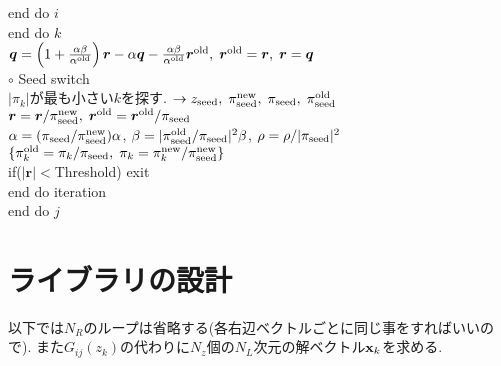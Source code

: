 \documentclass[12pt,titlepage]{jarticle}
\begin{document}
end do $i$
\\\hspace{1.0cm}
end do $k$
\\\hspace{1.0cm}
${\boldsymbol q} = \left( 1 + \frac{\alpha \beta}{\alpha^{\rm old}} \right) {\boldsymbol r}
- \alpha {\boldsymbol q} - \frac{\alpha \beta}{\alpha^{\rm old}} {\boldsymbol r}^{\rm old},\; 
{\boldsymbol r}^{\rm old} = {\boldsymbol r},\; {\boldsymbol r} = {\boldsymbol q}$
\\\hspace{1.0cm}
$\circ$ Seed switch
\\\hspace{1.0cm}
$|\pi_k|$が最も小さい$k$を探す. 
$\rightarrow z_{\rm seed},\; \pi_{\rm seed}^{\rm new},\; \pi_{\rm seed},\; \pi_{\rm seed}^{\rm old} $
\\\hspace{1.0cm}
${\boldsymbol r} = {\boldsymbol r} / \pi_{\rm seed}^{\rm new},\; 
{\boldsymbol r}^{\rm old} = {\boldsymbol r}^{\rm old} / \pi_{\rm seed}$
\\\hspace{1.0cm}
$\alpha = (\pi_{\rm seed} / \pi_{\rm seed}^{\rm new}) \alpha$,
$\beta = |\pi_{\rm seed}^{\rm old} / \pi_{\rm seed}|^2 \beta$,
$\rho = \rho / |\pi_{\rm seed}|^2$
\\\hspace{1.0cm}
$\{\pi_k^{\rm old} = \pi_k/\pi_{\rm seed},\; \pi_k = \pi_k^{\rm new}/\pi_{\rm seed}^{\rm new}\}$
\\\hspace{1.0cm}
if($|{\boldsymbol r}| < $Threshold) exit
\\\hspace{0.5cm}
end do iteration
\\
end do $j$

\section{ライブラリの設計}

以下では$N_R$のループは省略する(各右辺ベクトルごとに同じ事をすればいいので).
また$G_{i j}(z_k)$の代わりに$N_z$個の$N_L$次元の解ベクトル${\bf x}_{k}$を求める.
\end{document}
